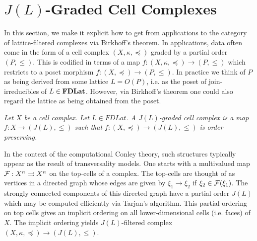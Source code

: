 



\section{$J(L)$-Graded Cell Complexes}

In this section, we make it explicit how to get from applications to the category of lattice-filtered complexes via Birkhoff's theorem.  In applications, data often come in the form of a cell complex $(X,\kappa,\preceq)$ graded by a partial order $(P,\leq)$.  This is codified in terms of a map $f:(X,\kappa, \preceq)\to (P,\leq)$ which restricts to a poset morphism $f:(X,\preceq)\to (P,\leq)$.  In practice we think of $P$ as being derived from some lattice $L=O(P)$, i.e. as the poset of join-irreducibles of $L\in {\bf FDLat}$.  However, via Birkhoff's theorem one could also regard the lattice as being obtained from the poset.

\begin{defn}
{\em
Let $X$ be a cell complex.  Let $L\in FDLat$.  A {\em $J(L)$-graded cell complex} is a map $f:X\to (J(L),\leq)$ such that $f:(X,\preceq)\to (J(L),\leq)$ is order preserving.
}
\end{defn}


In the context of the computational Conley theory, such structures typically appear as the result of transversality models.  One starts with a multivalued map ${\mathcal F}: X^n\rightrightarrows X^n$ on the top-cells of a complex.    The top-cells are thought of as vertices in a directed graph whose edges are given by $\xi_1\to \xi_2$ if $\xi_2\in {\mathcal F}(\xi_1)$.  The strongly connected components of this directed graph have a partial order $J(L)$ which may be computed efficiently via Tarjan's algorithm.   This partial-ordering on top cells gives an implicit ordering on all lower-dimensional cells (i.e. faces) of $X$.  The implicit ordering yields $J(L)$-filtered complex $(X,\kappa,\preceq)\to (J(L),\leq)$.




